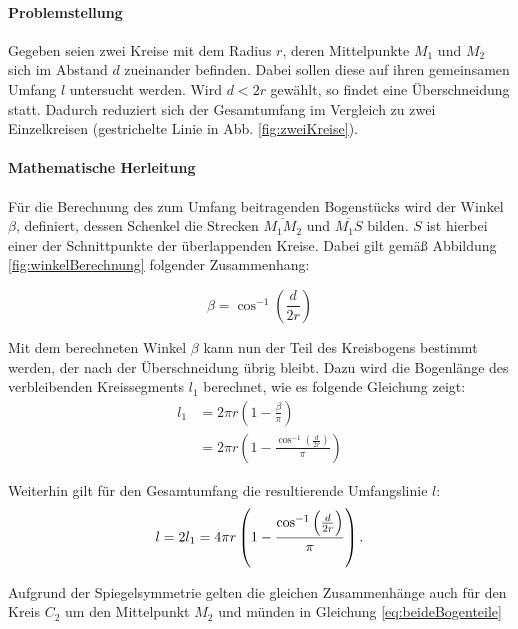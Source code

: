 \documentclass[accentcolor=tud1c, 11pt, toc=bib, toc=listof, captions=abovetable, parskip=half]{tudreport}
\begin{document}
\paragraph{Problemstellung}
Gegeben seien zwei Kreise mit dem Radius $r$, deren Mittelpunkte $M_1$ und $M_2$ sich im Abstand $d$ zueinander befinden. Dabei sollen diese auf ihren gemeinsamen Umfang $l$ untersucht werden. Wird $d < 2r$ gewählt, so findet eine Überschneidung statt. Dadurch reduziert sich der Gesamtumfang im Vergleich zu zwei Einzelkreisen (gestrichelte Linie in Abb. \ref{fig:zweiKreise}).

\paragraph{Mathematische Herleitung}
Für die Berechnung des zum Umfang beitragenden Bogenstücks wird der Winkel $\beta$, 
definiert, dessen Schenkel die Strecken $\overline{M_1M_2}$ und $\overline{M_1S}$ bilden. 
$S$ ist hierbei einer der Schnittpunkte der überlappenden Kreise. Dabei gilt gemäß Abbildung \ref{fig:winkelBerechnung} folgender Zusammenhang:

\begin{equation}
\beta = \cos^{-1}\left(\frac{d}{2r}\right)
\label{eq:beta}
\end{equation}

Mit dem berechneten Winkel $\beta$ kann nun der Teil des Kreisbogens bestimmt werden, der nach der Überschneidung übrig bleibt. Dazu wird die Bogenlänge des verbleibenden Kreissegments $l_1$ berechnet, wie es folgende Gleichung zeigt: \\
\begin{equation}
\begin{split}
l_1 &= 2 \pi r\left(1-\frac{\beta}{\pi}\right) \\
    &= 2 \pi r\left(1-\frac{\cos^{-1}\left(\frac{d}{2r}\right)}{\pi}\right)
\end{split}
\label{eq:einBogenteil}
\end{equation}

Weiterhin gilt für den Gesamtumfang die resultierende Umfangslinie $l$:
\begin{equation}
l = 2 l_1 = 4 \pi r\left(1-\frac{\cos^{-1}\left(\frac{d}{2r}\right)}{\pi}\right). \\
\label{eq:beideBogenteile}
\end{equation}

Aufgrund der Spiegelsymmetrie gelten die gleichen Zusammenhänge auch für den Kreis $C_2$ um den Mittelpunkt $M_2$ und münden in Gleichung \ref{eq:beideBogenteile}
\end{document}
